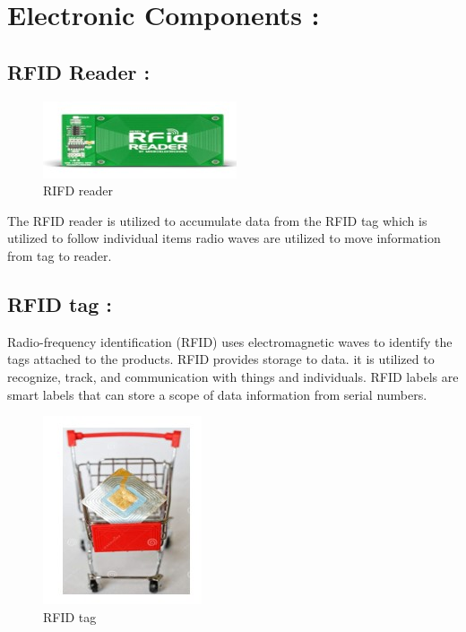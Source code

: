 \documentclass[conference]{IEEEtran}
\begin{document}
\section{Electronic Components :}

\subsection{RFID Reader :}
\begin{figure}[htbp]
	\centerline{\includegraphics{RFID_Reader}}
	\caption{RIFD reader}
	\label{fig}
\end{figure} 
The RFID reader is utilized to accumulate data from the RFID tag which is utilized to follow individual items radio waves are utilized to move information from tag to reader\cite{b1}.
   

\subsection{RFID tag :}
Radio-frequency identification (RFID) uses electromagnetic waves to identify the tags attached to the products. RFID provides storage to data. it is utilized to recognize, track, and communication with things and individuals. RFID labels are smart labels that can store a scope of data information from serial numbers\cite{b1}.
\begin{figure}[htbp]
	\centerline{\includegraphics{RFID_Tag}}
	\caption{RFID tag}
	\label{fig}
\end{figure}
\end{document}
